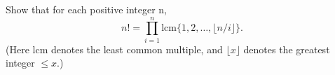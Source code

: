 Show that for each positive integer  n,
\[
    n! = \prod_{i=1}^n  \mathrm{lcm}\{1, 2, \dots, \lfloor n/i\rfloor\} .
\]
(Here $\mathrm{lcm}$ denotes the least common multiple, and
$\lfloor x \rfloor$ denotes the greatest integer $\leq x$.)
